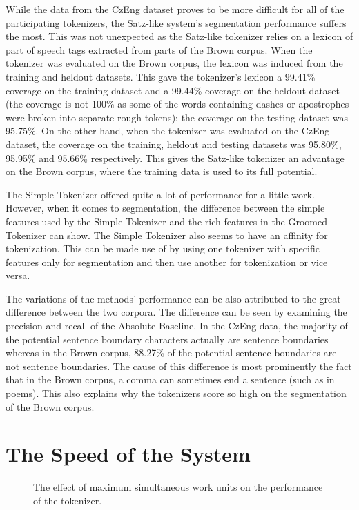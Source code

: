 While the data from the CzEng dataset proves to be more difficult for all of
the participating tokenizers, the Satz-like system's segmentation performance
suffers the most. This was not unexpected as the Satz-like tokenizer relies on
a lexicon of part of speech tags extracted from parts of the Brown corpus. When
the tokenizer was evaluated on the Brown corpus, the lexicon was induced from
the training and heldout datasets. This gave the tokenizer's lexicon a 99.41\%
coverage on the training dataset and a 99.44\% coverage on the heldout dataset
(the coverage is not 100\% as some of the words containing dashes or
apostrophes were broken into separate rough tokens); the coverage on the
testing dataset was 95.75\%. On the other hand, when the tokenizer was
evaluated on the CzEng dataset, the coverage on the training, heldout and
testing datasets was 95.80\%, 95.95\% and 95.66\% respectively. This gives the
Satz-like tokenizer an advantage on the Brown corpus, where the training data
is used to its full potential.

The Simple Tokenizer offered quite a lot of performance for a little work.
However, when it comes to segmentation, the difference between the simple
features used by the Simple Tokenizer and the rich features in the Groomed
Tokenizer can show. The Simple Tokenizer also seems to have an affinity for
tokenization. This can be made use of by using one tokenizer with specific
features only for segmentation and then use another for tokenization or vice
versa.

The variations of the methods' performance can be also attributed to the great
difference between the two corpora. The difference can be seen by examining the
precision and recall of the Absolute Baseline. In the CzEng data, the majority of
the potential sentence boundary characters actually are sentence boundaries
whereas in the Brown corpus, 88.27\% of the potential sentence boundaries are
not sentence boundaries. The cause of this difference is most prominently the
fact that in the Brown corpus, a comma can sometimes end a sentence (such as in
poems). This also explains why the tokenizers score so high on the segmentation
of the Brown corpus.

\section{The Speed of the System}
\label{sec:eval-spd}

\begin{figure}
  \begin{center}
    
    \caption{The effect of maximum simultaneous work units on the performance of
             the tokenizer.}
    \label{fig:plot-work-units}
  \end{center}
\end{figure}
